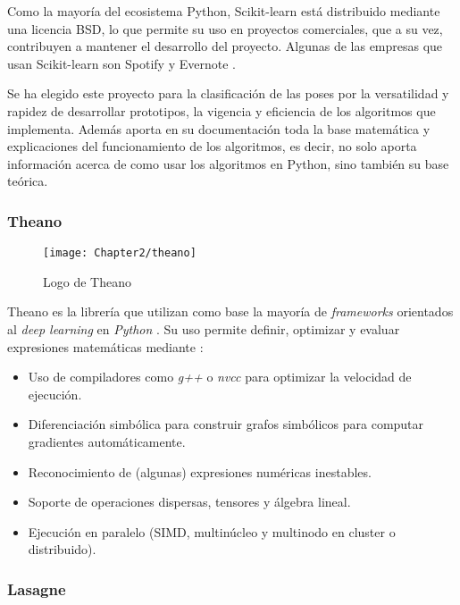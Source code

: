 Como la mayoría del ecosistema Python, Scikit-learn está distribuido mediante
una licencia BSD, lo que permite su uso en proyectos comerciales, que a su vez,
contribuyen a mantener el desarrollo del proyecto. Algunas de las empresas que
usan Scikit-learn son Spotify y Evernote \cite{scikit-learn-empresas}.

Se ha elegido este proyecto para la clasificación de las poses por la versatilidad
y rapidez de desarrollar prototipos, la vigencia y eficiencia de los algoritmos
que implementa. Además aporta en su documentación toda la base matemática y
explicaciones del funcionamiento de los algoritmos, es decir, no solo aporta
información acerca de como usar los algoritmos en Python, sino también su base
teórica.


\subsubsection{Theano}
\label{subs:theano}

\begin{figure}[htp]
  \centering
    \texttt{[image: Chapter2/theano]}
  \caption{Logo de Theano}
\label{fig:theano}
\end{figure}


Theano es la librería que utilizan como base la mayoría de \textit{frameworks} orientados al \textit{deep learning} 
en \textit{Python} \cite{theano-based-projects}. Su uso permite definir, optimizar y evaluar expresiones matemáticas 
mediante \cite{theano}:

\begin{itemize}

	\item Uso de compiladores como \textit{g++} o \textit{nvcc} para optimizar la velocidad de ejecución.
	\item Diferenciación simbólica para construir grafos simbólicos para computar gradientes automáticamente.
	\item Reconocimiento de (algunas) expresiones numéricas inestables. 
	\item Soporte de operaciones dispersas, tensores y álgebra lineal.
	\item Ejecución en paralelo (SIMD, multinúcleo y multinodo en cluster o distribuido).

\end{itemize}


\subsubsection{Lasagne}
\label{subs:lasagne}

